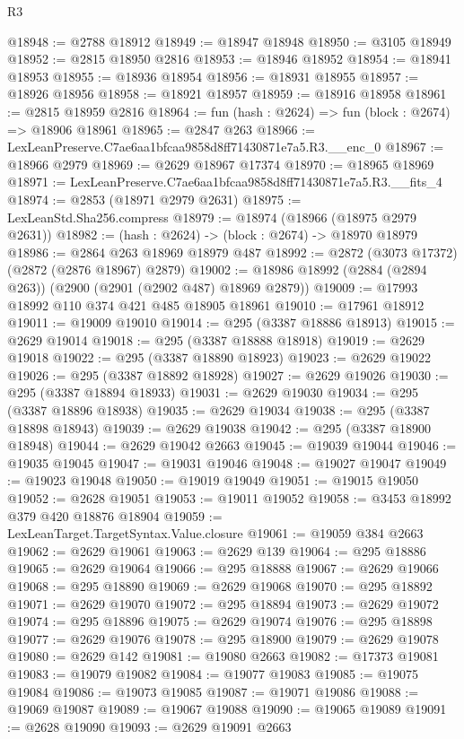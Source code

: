 \begin{lexlean}{R3}
\begin{coremodule}
@18948 := @2788 @18912
@18949 := @18947 @18948
@18950 := @3105 @18949
@18952 := @2815 @18950 @2816
@18953 := @18946 @18952
@18954 := @18941 @18953
@18955 := @18936 @18954
@18956 := @18931 @18955
@18957 := @18926 @18956
@18958 := @18921 @18957
@18959 := @18916 @18958
@18961 := @2815 @18959 @2816
@18964 := fun (hash : @2624) => fun (block : @2674) => @18906 @18961
@18965 := @2847 @263
@18966 := LexLeanPreserve.C7ae6aa1bfcaa9858d8ff71430871e7a5.R3.__enc_0
@18967 := @18966 @2979
@18969 := @2629 @18967 @17374
@18970 := @18965 @18969
@18971 := LexLeanPreserve.C7ae6aa1bfcaa9858d8ff71430871e7a5.R3.__fits_4
@18974 := @2853 (@18971 @2979 @2631)
@18975 := LexLeanStd.Sha256.compress
@18979 := @18974 (@18966 (@18975 @2979 @2631))
@18982 := (hash : @2624) -> (block : @2674) -> @18970 @18979
@18986 := @2864 @263 @18969 @18979 @487
@18992 := @2872 (@3073 @17372) (@2872 (@2876 @18967) @2879)
@19002 := @18986 @18992 (@2884 (@2894 @263)) (@2900 (@2901 (@2902 @487) @18969 @2879))
@19009 := @17993 @18992 @110 @374 @421 @485 @18905 @18961
@19010 := @17961 @18912
@19011 := @19009 @19010
@19014 := @295 (@3387 @18886 @18913)
@19015 := @2629 @19014
@19018 := @295 (@3387 @18888 @18918)
@19019 := @2629 @19018
@19022 := @295 (@3387 @18890 @18923)
@19023 := @2629 @19022
@19026 := @295 (@3387 @18892 @18928)
@19027 := @2629 @19026
@19030 := @295 (@3387 @18894 @18933)
@19031 := @2629 @19030
@19034 := @295 (@3387 @18896 @18938)
@19035 := @2629 @19034
@19038 := @295 (@3387 @18898 @18943)
@19039 := @2629 @19038
@19042 := @295 (@3387 @18900 @18948)
@19044 := @2629 @19042 @2663
@19045 := @19039 @19044
@19046 := @19035 @19045
@19047 := @19031 @19046
@19048 := @19027 @19047
@19049 := @19023 @19048
@19050 := @19019 @19049
@19051 := @19015 @19050
@19052 := @2628 @19051
@19053 := @19011 @19052
@19058 := @3453 @18992 @379 @420 @18876 @18904
@19059 := LexLeanTarget.TargetSyntax.Value.closure
@19061 := @19059 @384 @2663
@19062 := @2629 @19061
@19063 := @2629 @139
@19064 := @295 @18886
@19065 := @2629 @19064
@19066 := @295 @18888
@19067 := @2629 @19066
@19068 := @295 @18890
@19069 := @2629 @19068
@19070 := @295 @18892
@19071 := @2629 @19070
@19072 := @295 @18894
@19073 := @2629 @19072
@19074 := @295 @18896
@19075 := @2629 @19074
@19076 := @295 @18898
@19077 := @2629 @19076
@19078 := @295 @18900
@19079 := @2629 @19078
@19080 := @2629 @142
@19081 := @19080 @2663
@19082 := @17373 @19081
@19083 := @19079 @19082
@19084 := @19077 @19083
@19085 := @19075 @19084
@19086 := @19073 @19085
@19087 := @19071 @19086
@19088 := @19069 @19087
@19089 := @19067 @19088
@19090 := @19065 @19089
@19091 := @2628 @19090
@19093 := @2629 @19091 @2663

\end{coremodule}
\end{lexlean}
